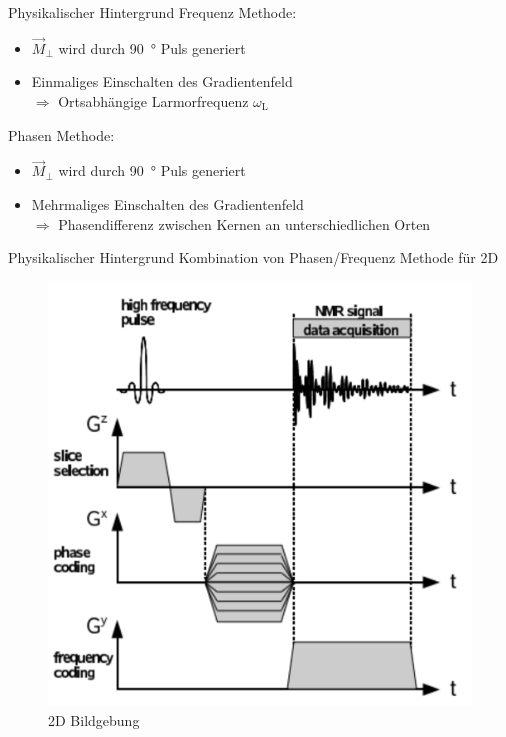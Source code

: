 \begin{frame}{Physikalischer Hintergrund}
Frequenz Methode:
	\begin{itemize}
	\item $\vec{M}_\bot$ wird durch \SI{90}{\degree} Puls generiert
	\item Einmaliges Einschalten des Gradientenfeld\\
	$\Rightarrow$ Ortsabhängige Larmorfrequenz $\omega_\text{L}$
	\end{itemize}
\vspace{.5cm}
Phasen Methode:
	\begin{itemize}
	\item $\vec{M}_\bot$ wird durch \SI{90}{\degree} Puls generiert
	\item Mehrmaliges Einschalten des Gradientenfeld\\
	$\Rightarrow$ Phasendifferenz zwischen Kernen an unterschiedlichen Orten
	\end{itemize}
\end{frame}

\begin{frame}{Physikalischer Hintergrund}
Kombination von Phasen/Frequenz Methode für 2D %
	\begin{figure}
	\centering
	\includegraphics[scale=.15]{images//signal.png}
	\caption{2D Bildgebung \cite{script_nmr}}
	\end{figure}
\end{frame}

